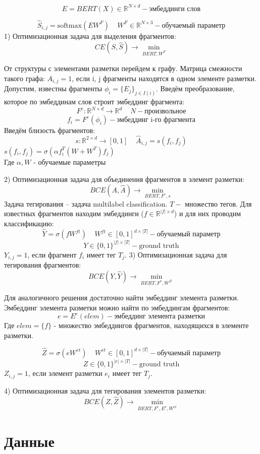 \documentclass{article}
\begin{document}
$$
E = BERT(X) \in \mathbb{R}^{N \times d} - \text{эмбеддинги слов}
$$

$$
\hat{S}_{i, j} = \text{softmax}(E W^F)~~~~~W^F \in \mathbb{R}^{N \times 3} - \text{обучаемый параметр}
$$
1) Оптимизационная задача для выделения фрагментов:
$$
CE(S, \hat{S}) \rightarrow \min_{BERT, W^F}
$$

От структуры с элементами разметки перейдем к графу.
Матрица смежности такого графа:
$A_{i, j} = 1$, если i, j фрагменты находятся в одном элементе разметки.
Допустим, известны фрагменты
$\phi_i = \{ E_j \}_{j \in I(i)}$.
Введём преобразование, которое по эмбеддинам слов строит эмбеддинг фрагмента:
$$
F^e: \mathbb{R}^{N \times d} \rightarrow \mathbb{R}^d ~~~~~ N - \text{произвольное}
$$
$$
f_i = F^e(\phi_i) - \text{эмбеддинг i-го фрагмента}
$$
Введём близость фрагментов:
$$
s: \mathbb{R}^{2 \times d} \rightarrow [0, 1] ~~~~~\hat{A}_{i, j} = s(f_i, f_j)
$$
$s(f_i, f_j) = \sigma( \alpha f_i^T (W + W^T) f_j)$ \\
Где $\alpha, W$ - обучаемые параметры

2) Оптимизационная задача для объединения фрагментов в элемент разметки:
$$
BCE(A, \hat{A}) \rightarrow \min_{BERT, F^e, s}
$$
Задача тегирования -- задача multilabel classification. $T - $ множество тегов. Для известных фрагментов находим эмбеддинги ($f \in \mathbb{R}^{|f| \times d}$) и для них проводим классификацию:
$$
\hat{Y} = \sigma (f W^{ft})~~~~~ W^{ft} \in [0, 1]^{d \times |T|} - \text{обучаемый параметр}
$$
$$
Y \in \{0, 1\}^{|f| \times|T|} - \text{ground truth}
$$
$Y_{i, j} = 1$, если фрагмент $f_i$ имеет тег $T_j$.
3) Оптимизационная задача для тегирования фрагментов:
$$
BCE(Y, \hat{Y}) \rightarrow \min_{BERT, F^e, W^{ft}}
$$

Для аналогичного решения достаточно найти эмбеддинг элемента разметки.\\
Эмбеддинг элемента разметки можно найти по эмбеддингам фрагментов:
$$
e = E^e(elem) - \text{эмбеддинг элемента разметки}
$$
Где $elem = \{f\}$ - множество эмбеддингов фрагментов, находящихся в элементе разметки.


$$
\hat{Z} = \sigma (e W^{et})~~~~~ W^{et} \in [0, 1]^{d \times |T|} - \text{обучаемый параметр}
$$
$$
Z \in \{0, 1\}^{|e| \times|T|} - \text{ground truth}
$$
$Z_{i, j} = 1$, если элемент разметки $e_i$ имеет тег $T_j$.

4) Оптимизационная задача для тегирования элементов разметки:
$$
BCE(Z, \hat{Z}) \rightarrow \min_{BERT, F^e, E^e, W^{et}}
$$


\section{Данные}
\end{document}
